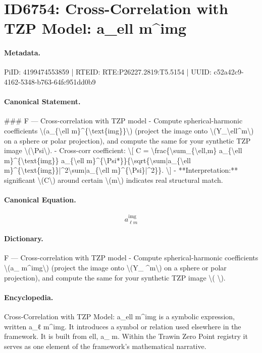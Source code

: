 \section*{ID6754: Cross-Correlation with TZP Model: a\_ell m\textasciicircum{}img}
\paragraph{Metadata.}
PiID: 4199474553859 | RTEID: RTE:P26227.2819:T5.5154 | UUID: c52a42c9-4162-5348-b763-64fc951dd0b9

\paragraph{Canonical Statement.}
\#\#\# F — Cross-correlation with TZP model - Compute spherical-harmonic coefficients \textbackslash{}(a\_\{\textbackslash{}ell m\}\textasciicircum{}\{\textbackslash{}text\{img\}\}\textbackslash{}) (project the image onto \textbackslash{}(Y\_\textbackslash{}ell\textasciicircum{}m\textbackslash{}) on a sphere or polar projection), and compute the same for your synthetic TZP image \textbackslash{}(\textbackslash{}Psi\textbackslash{}). - Cross-corr coefficient: \textbackslash{}[ C = \textbackslash{}frac\{\textbackslash{}sum\_\{\textbackslash{}ell,m\} a\_\{\textbackslash{}ell m\}\textasciicircum{}\{\textbackslash{}text\{img\}\} a\_\{\textbackslash{}ell m\}\textasciicircum{}\{\textbackslash{}Psi*\}\}\{\textbackslash{}sqrt\{\textbackslash{}sum|a\_\{\textbackslash{}ell m\}\textasciicircum{}\{\textbackslash{}text\{img\}\}|\textasciicircum{}2\textbackslash{}sum|a\_\{\textbackslash{}ell m\}\textasciicircum{}\{\textbackslash{}Psi\}|\textasciicircum{}2\}\}. \textbackslash{}] - **Interpretation:** significant \textbackslash{}(C\textbackslash{}) around certain \textbackslash{}(m\textbackslash{}) indicates real structural match.

\paragraph{Canonical Equation.}
\[
a_{\ell m}^{\text{img}}
\]

\paragraph{Dictionary.}
F — Cross-correlation with TZP model - Compute spherical-harmonic coefficients \textbackslash{}(a\_ m\textasciicircum{}img\textbackslash{}) (project the image onto \textbackslash{}(Y\_ \textasciicircum{}m\textbackslash{}) on a sphere or polar projection), and compute the same for your synthetic TZP image \textbackslash{}( \textbackslash{}).

\paragraph{Encyclopedia.}
Cross-Correlation with TZP Model: a\_ell m\textasciicircum{}img is a symbolic expression, written a\_ℓ m\textasciicircum{}img. It introduces a symbol or relation used elsewhere in the framework. It is built from ell, a\_ m. Within the Trawin Zero Point registry it serves as one element of the framework's mathematical narrative.
